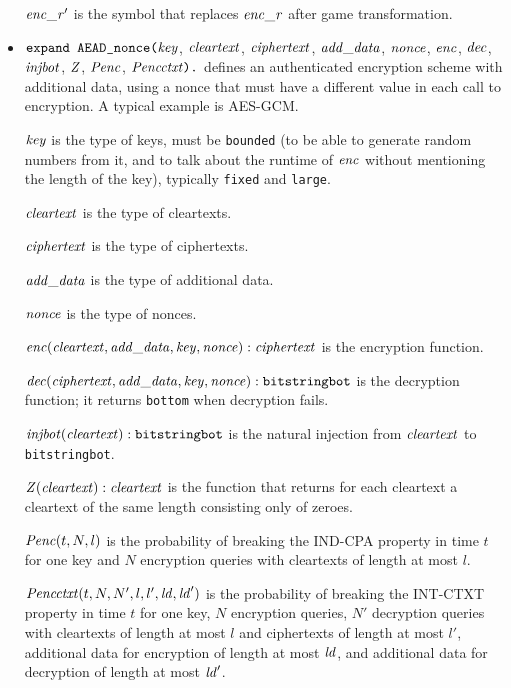 \documentclass{article}
\begin{document}
\begin{itemize}
  $\mathit{enc\_r}'$ is the symbol that replaces $\mathit{enc\_r}$ after game transformation.


\item $\texttt{expand AEAD\_nonce(}\mathit{key}$,
$  \mathit{cleartext}$, $\mathit{ciphertext}$, $\mathit{add\_data}$, $\mathit{nonce}$, $\mathit{enc}$,
$  \mathit{dec}$, $\mathit{injbot}$, $\mathit{Z}$, $\mathit{Penc}$, $\mathit{Pencctxt}\texttt{).}$ defines an
authenticated encryption scheme with additional data, using a nonce that must have a different
value in each call to encryption. A typical example is AES-GCM.

   $\mathit{key}$ is the type of keys, must be \texttt{bounded} (to be able to generate random numbers from it, and to talk about the runtime of $\mathit{enc}$ without mentioning the length of the key), typically \texttt{fixed} and \texttt{large}.

   $\mathit{cleartext}$ is the type of cleartexts.

   $\mathit{ciphertext}$ is the type of ciphertexts.

   $\mathit{add\_data}$ is the type of additional data.

   $\mathit{nonce}$ is the type of nonces.

   $\mathit{enc}(\mathit{cleartext}, \mathit{add\_data}, \mathit{key}, \mathit{nonce}): \mathit{ciphertext}$ is the encryption function. 

   $\mathit{dec}(\mathit{ciphertext}, \mathit{add\_data}, \mathit{key}, \mathit{nonce}): \texttt{bitstringbot}$ is the
  decryption function; it returns \texttt{bottom} when decryption
  fails.

   $\mathit{injbot}(\mathit{cleartext}): \texttt{bitstringbot}$ is the natural
  injection from $\mathit{cleartext}$ to \texttt{bitstringbot}.

   $\mathit{Z}(\mathit{cleartext}): \mathit{cleartext}$ is the function that
  returns for each cleartext a cleartext of the same length consisting
  only of zeroes.

  $\mathit{Penc}(t, N, l)$ is the probability of breaking the IND-CPA
  property in time $t$ for one key and $N$ encryption queries with
  cleartexts of length at most $l$.

  $\mathit{Pencctxt}(t, N, N', l, l', \mathit{ld}, \mathit{ld}')$ is the probability of
  breaking the INT-CTXT property in time $t$ for one key, $N$
  encryption queries, $N'$ decryption queries with cleartexts of
  length at most $l$ and ciphertexts of length at most $l'$,
  additional data for encryption of length at most $\mathit{ld}$, and
  additional data for decryption of length at most $\mathit{ld}'$.


\end{itemize}
\end{document}
